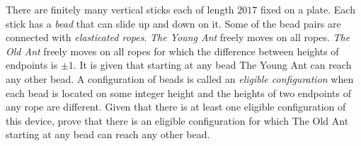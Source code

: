There are finitely many vertical sticks each of length $2017$ fixed on a plate. Each stick has a \emph{bead} that can slide up and down on it. Some of the bead pairs are connected with \emph{elasticated ropes}. \emph{The Young Ant} freely moves on all ropes. \emph{The Old Ant} freely moves on all ropes for which the difference between heights of endpoints is $\pm 1$. It is given that starting at any bead The Young Ant can reach any other bead. A configuration of beads is called an \emph{eligible configuration} when each bead is located on some integer height and the heights of two endpoints of any rope are different. Given that there is at least one eligible configuration of this device, prove that there is an eligible configuration for which The Old Ant starting at any bead can reach any other bead.
